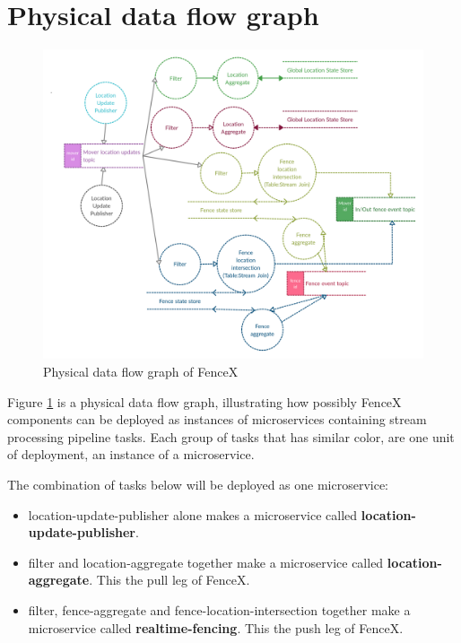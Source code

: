 \documentclass[a4]{report}
\begin{document}
    \section{Physical data flow graph}
    \begin{figure}[ht]
        \centering
        \caption{Physical data flow graph of FenceX}
        \label{fig:physical-dfg}
        \includegraphics[width=\linewidth ,scale=0.2]{images/physical-data-flow-diagram.png}
    \end{figure}

    \clearpage

    Figure \ref{fig:physical-dfg} is a physical data flow graph, illustrating how possibly FenceX components can be
    deployed as instances of microservices containing stream processing pipeline tasks.
    Each group of tasks that has similar color, are one unit of deployment, an instance of a microservice.

    The combination of tasks below will be deployed as one microservice:
    \begin{itemize}
        \item{location-update-publisher} alone makes a microservice called \textbf{location-update-publisher}.
        \item{filter and location-aggregate} together make a microservice called \textbf{location-aggregate}.
        This the pull leg of FenceX.
        \item{filter, fence-aggregate and fence-location-intersection} together make a microservice called \textbf{realtime-fencing}.
        This the push leg of FenceX.
    \end{itemize}
\end{document}
